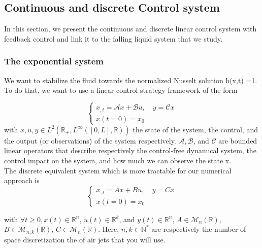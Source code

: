 \documentclass[12pt]{article}
\begin{document}
\subsection{Continuous and discrete Control system }
In this section, we present the continuous and discrete linear control system with feedback control and link it to the falling liquid system that we study.

\subsubsection{The exponential system}
We want to stabilize the fluid towards the normalized Nusselt solution h(x,t) =1. To do that, we want to use a linear control strategy framework of the form

\begin{equation}\label{Ctrl_framework_continuous}
    \left\{ 
    \begin{aligned}
        x_{,t} = \mathcal{A}x+\mathcal{B}u, \quad y=\mathcal{C}x\\
        x(t=0) = x_0
    \end{aligned}
    \right.
\end{equation}
with $x, u, y\in L^{2}(\mathbb{R}_+, L^{\infty}([0,L],\mathbb{R}))$ the state of the system, the control, and the output 
(or observations) of the system respectively. $\mathcal{A}, \mathcal{B}$, and $\mathcal{C}$ are bounded linear operators 
that describe respectively the control-free dynamical system, the control impact on the system, and how much we can observe the state x.
\\ 

The discrete equivalent system which is more tractable for our numerical approach is 
\begin{equation}\label{Ctrl_framework_discrete}
    \left\{ 
    \begin{aligned}
        x_{,t} = Ax+Bu, \quad y=Cx\\
        x(t=0) = x_0
    \end{aligned}
    \right.
\end{equation}

with $\forall t\geq 0, x(t)\in \mathbb{R}^n$, $u(t)\in \mathbb{R}^k$, and $y(t) \in \mathbb{R}^n$, 
$A \in \mathcal{M}_{n}(\mathbb{R})$, $B \in \mathcal{M}_{n, k}(\mathbb{R})$, $C \in \mathcal{M}_{n}(\mathbb{R})$. 
Here, $n,k \in  \mathbb{N}^*$ are respectively the number of space discretization the of air jets that you will use. \\
\end{document}
